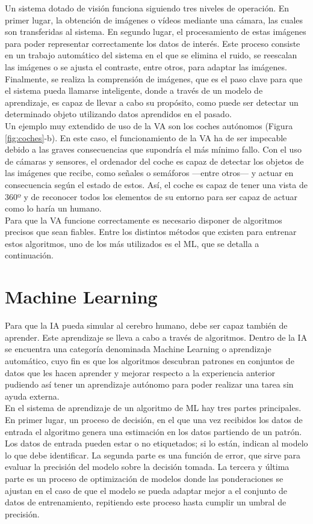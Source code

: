 Un sistema dotado de visión funciona siguiendo tres niveles de operación. En primer lugar, la obtención de imágenes o vídeos mediante una cámara, las cuales son transferidas al sistema. En segundo lugar, el procesamiento de estas imágenes para poder representar correctamente los datos de interés. Este proceso consiste en un trabajo automático del sistema en el que se elimina el ruido, se reescalan las imágenes o se ajusta el contraste, entre otros, para adaptar las imágenes. Finalmente, se realiza la comprensión de imágenes, que es el paso clave para que el sistema pueda llamarse inteligente, donde a través de un modelo de aprendizaje, es capaz de llevar a cabo su propósito, como puede ser detectar un determinado objeto utilizando datos aprendidos en el pasado.\\

Un ejemplo muy extendido de uso de la VA son los coches autónomos (Figura \ref{fig:coches}-b). En este caso, el funcionamiento de la VA ha de ser impecable debido a las graves consecuencias que supondría el más mínimo fallo. Con el uso de cámaras y sensores, el ordenador del coche es capaz de detectar los objetos de las imágenes que recibe, como señales o semáforos ---entre otros--- y actuar en consecuencia según el estado de estos. Así, el coche es capaz de tener una vista de 360º y de reconocer todos los elementos de su entorno para ser capaz de actuar como lo haría un humano.\\

Para que la VA funcione correctamente es necesario disponer de algoritmos precisos que sean fiables. Entre los distintos métodos que existen para entrenar estos algoritmos, uno de los más utilizados es el ML, que se detalla a continuación.

\section{Machine Learning}
Para que la IA pueda simular al cerebro humano, debe ser capaz también de aprender. Este aprendizaje se lleva a cabo a través de algoritmos. Dentro de la IA se encuentra una categoría denominada Machine Learning o aprendizaje automático, cuyo fin es que los algoritmos descubran patrones en conjuntos de datos que les hacen aprender y mejorar respecto a la experiencia anterior pudiendo así tener un aprendizaje autónomo para poder realizar una tarea sin ayuda externa.\\

En el sistema de aprendizaje de un algoritmo de ML hay tres partes principales. En primer lugar, un proceso de decisión, en el que una vez recibidos los datos de entrada el algoritmo genera una estimación en los datos partiendo de un patrón. Los datos de entrada pueden estar o no etiquetados; si lo están, indican al modelo lo que debe identificar. La segunda parte es una función de error, que sirve para evaluar la precisión del modelo sobre la decisión tomada. La tercera y última parte es un proceso de optimización de modelos donde las ponderaciones se ajustan en el caso de que el modelo se pueda adaptar mejor a el conjunto de datos de entrenamiento, repitiendo este proceso hasta cumplir un umbral de precisión.\\

